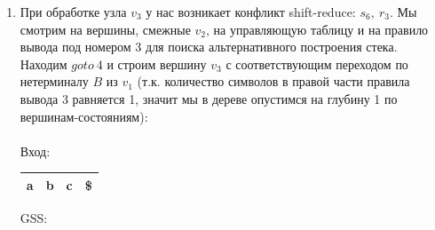 \begin{example}
\begin{enumerate}
\begin{tikzpicture}[x=0.5pt,y=0.5pt,yscale=-1,xscale=1]
        
        \end{tikzpicture}
        \\
        
        \item При обработке узла $v_3$ у нас возникает конфликт shift-reduce: $s_6,\ r_3$. Мы смотрим на вершины, смежные $v_2$, на управляющую таблицу и на правило вывода под номером 3 для поиска альтернативного построения стека. Находим $goto\ 4$ и строим вершину $v_3$ с соответствующим переходом по нетерминалу $B$ из $v_1$ (т.к. количество символов в правой части правила вывода 3 равняется 1, значит мы в дереве опустимся на глубину 1 по вершинам-состояниям):\\ \\
        Вход: \,
        \begin{tabular}[c]{ |c|c|c|c| } 
            \hline a & b & c & \$ \\ \hline
        \end{tabular}
        \qquad GSS: \,
        \begin{tikzpicture}[x=0.5pt,y=0.5pt,yscale=-1,xscale=1]
        

\end{tikzpicture}
\end{enumerate}
\end{example}
